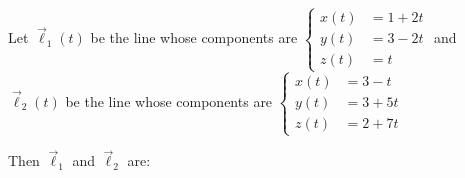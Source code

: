 \documentclass{ximera}
\author{Gregory Hartman \and Matthew Carr}
\begin{document}
\begin{exercise}




Let $\vec{\ell}_{1}(t)$ be the line whose components are $\left\{ \begin{aligned}x(t) & =1+2t\\
y(t) & =3-2t\\
z(t) & =t
\end{aligned}
\right.$  and $\vec{\ell}_{2}(t)$ be the line whose components are $\left\{ \begin{aligned}x(t) & =3-t\\
y(t) & =3+5t\\
z(t) & =2+7t
\end{aligned}
\right.$

Then $\vec{\ell}_{1}$ and $\vec{\ell}_{2}$ are: 

\begin{multipleChoice}
\end{multipleChoice}


\end{exercise}
\end{document}
